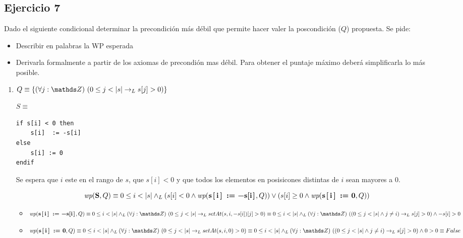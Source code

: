 \subsection{Ejercicio 7}
Dado el siguiente condicional determinar la precondición más débil que permite hacer valer la poscondición ($Q$) propuesta. Se pide:

\begin{itemize}
    \item Describir en palabras la WP esperada
    \item Derivarla formalmente a partir de los axiomas de precondión mas débil. Para obtener el puntaje máximo deberá simplificarla lo más posible.
\end{itemize}

\begin{enumerate}[label=\alph*)]
    \item $Q \equiv \{\paraTodo{j}{\ent}{0 \leq j < |s| \thenLuego s[j] > 0}\}$

          $S \equiv$
          \begin{lstlisting}
if s[i] < 0 then
    s[i]  := -s[i]
else
    s[i] := 0
endif
    \end{lstlisting}

          Se espera que $i$ este en el rango de $s$, que $s[i] < 0$ y que todos los elementos en posisicones distintas de $i$ sean mayores a 0.

          \[\wp{S}{Q} \equiv 0 \leq i < |s| \yLuego (s[i] < 0 \land \wp{s[i] := -s[i]}{Q}) \lor (s[i] \geq 0 \land \wp{s[i] := 0}{Q})\]

          \begin{itemize}
              \item $
                        \wp{s[i] := -s[i]}{Q} \equiv 0 \leq i < |s| \yLuego \paraTodo{j}{\ent}{0 \leq j < |s| \thenLuego setAt(s,i,-s[i])[j] > 0} \\
                        \equiv 0 \leq i < |s| \yLuego \paraTodo{j}{\ent}{(0 \leq j < |s| \land j \neq i) \thenLuego s[j] > 0} \land -s[i] > 0
                    $

              \item $
                        \wp{s[i] := 0}{Q} \equiv 0 \leq i < |s| \yLuego \paraTodo{j}{\ent}{0 \leq j < |s| \thenLuego setAt(s,i,0) > 0} \\
                        \equiv 0 \leq i < |s| \yLuego \paraTodo{j}{\ent}{(0 \leq j < |s| \land j \neq i) \thenLuego s[j] > 0} \land 0 > 0 \\
                        \equiv False
                    $
          \end{itemize}


\end{enumerate}
